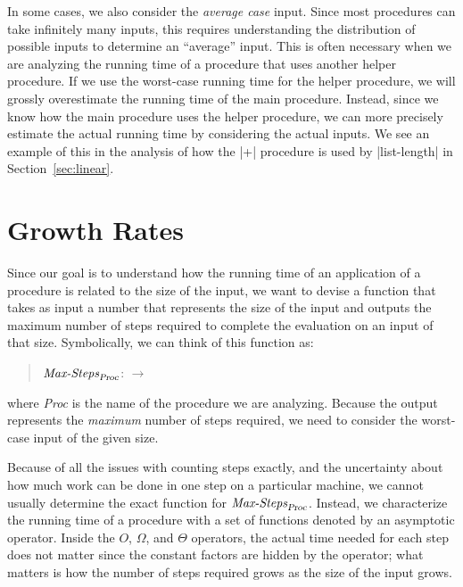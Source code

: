 \begin{schemeregion}
In some cases, we also consider the \emph{average case} input.  Since most procedures can take infinitely many inputs, this requires understanding the distribution of possible inputs to determine an ``average'' input.  This is often necessary when we are analyzing the running time of a procedure that uses another helper procedure.  If we use the worst-case running time for the helper procedure, we will grossly overestimate the running time of the main procedure.  Instead, since we know how the main procedure uses the helper procedure, we can more precisely estimate the actual running time by considering the actual inputs.  We see an example of this in the analysis of how the \scheme|+| procedure is used by \scheme|list-length| in Section~\ref{sec:linear}.

\section{Growth Rates}\label{sec:growthrates}

Since our goal is to understand how the running time of an application of a procedure is related to the size of the input, we want to devise a function that takes as input a number that represents the size of the input and outputs the maximum number of steps required to complete the evaluation on an input of that size.  Symbolically, we can think of this function as:
\begin{quote}
$\textrm{\emph{Max-Steps}}_{\textrm{\textsl{Proc}}}$:  $\rightarrow$ 
\end{quote}
where \textsl{Proc} is the name of the procedure we are analyzing.  Because the output represents the \emph{maximum} number of steps required, we need to consider the worst-case input of the given size.

Because of all the issues with counting steps exactly, and the uncertainty about how much work can be done in one step on a particular machine, we cannot usually determine the exact function for $\textrm{\emph{Max-Steps}}_{\textrm{\textsl{Proc}}}$.  Instead, we characterize the running time of a procedure with a set of functions denoted by an asymptotic operator.  Inside the $O$, $\Omega$, and $\Theta$ operators, the actual time needed for each step does not matter since the constant factors are hidden by the operator; what matters is how the number of steps required grows as the size of the input grows.  


\end{schemeregion}
